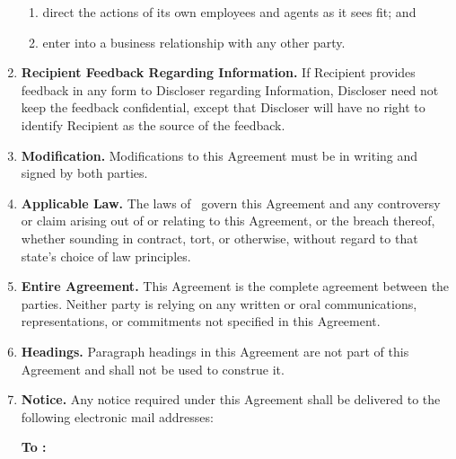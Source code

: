 \documentclass[12pt]{article}
\begin{document}
\begin{enumerate}
\begin{enumerate}
      \item direct the actions of its own employees and agents as it sees fit; and
      \item enter into a business relationship with any other party.
    \end{enumerate}
  \item {\bf Recipient Feedback Regarding Information.} If Recipient provides feedback in any form to Discloser regarding Information, Discloser need not keep the feedback confidential, except that Discloser will have no right to identify Recipient as the source of the feedback.
  \item {\bf Modification.} Modifications to this Agreement must be in writing and signed by both parties.
  \item {\bf Applicable Law.} The laws of \StateLaw\ govern this Agreement and any controversy or claim arising out of or relating to this Agreement, or the breach thereof, whether sounding in contract, tort, or otherwise, without regard to that state's choice of law principles.
  \item {\bf Entire Agreement.} This Agreement is the complete agreement between the parties. Neither party is relying on any written or oral communications, representations, or commitments not specified in this Agreement.
  \item {\bf Headings.} Paragraph headings in this Agreement are not part of this Agreement and shall not be used to construe it.
  \item
  {\bf Notice.} Any notice required under this Agreement shall be delivered to the following electronic mail addresses:

  {\bf To \PartyOneLegalName:} \PartyOneEmailAddress


\end{enumerate}
\end{document}
